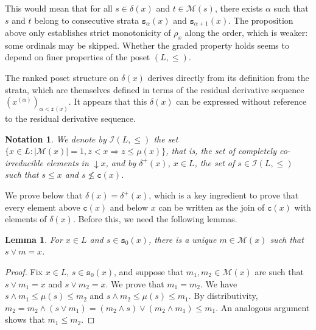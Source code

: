 \documentclass{article}
\newcommand{\comm}[2]{\begin{tcolorbox}[colback=gray!40]\textbf{Comment} (#1) : #2\end{tcolorbox}}
\newtheorem{lemma}[theorem]{Lemma}
\newtheorem{notation}[theorem]{Notation}
\begin{document}
{This would mean that for all \(s \in \delta(x)\) and \(t \in \mathcal{M}(s)\), there exists $\alpha$ such that $s$ and $t$ belong to consecutive strata \(\texttt{s}_{\alpha}(x)\) and \(\texttt{s}_{\alpha+1}(x)\). The proposition above only establishes strict monotonicity of \(\rho_x\) along the order, which is weaker: some ordinals may be skipped. Whether the graded property holds seems to depend on finer properties of the poset \((L,\le)\).}

{The ranked poset structure on \(\delta(x)\) derives directly from its definition from the strata, which are themselves defined in terms of the residual derivative sequence 
\((x^{(\alpha)})_{\alpha<\texttt{r}(x)}\). It appears that this $\delta(x)$
can be expressed without reference 
to the residual derivative sequence.}

\begin{notation}
We denote by $\mathcal{I}(L,\le)$ the set $\{x \in L : |\mathcal{M}(x)|=1, z < x \Rightarrow z \le \mu(x)\}$, {that is, the set of completely co-irreducible elements in $\mathop{\downarrow}x$}, and by ${\delta}^+(x)$, \(x\in L\), the set of $s\in \mathcal{I}(L,\le)$ such that $s \le x$ and $s \not \le \texttt{c}(x)$.
\end{notation}

{We prove below that $\delta(x) = \delta^+(x)$, which is a key ingredient to prove that every element above $\texttt{c}(x)$ and below $x$ can be written as the join of $\texttt{c}(x)$ with elements of $\delta(x)$. Before this, we need the following lemmas.}


\begin{lemma}\label{lemma.complement.uniqueness}
    For $x \in L$ and $s \in \texttt{s}_0(x)$, there is a unique $m \in \mathcal{M}(x)$ such that $s \vee m = x$.
\end{lemma}

\begin{proof}
Fix $x \in L$, $s \in \texttt{s}_0(x)$, and suppose that $m_1, m_2 \in \mathcal{M}(x)$ are such that $s \vee m_1 = x$ and $s \vee m_2 = x$. We prove that $m_1 = m_2$. We have $s \wedge m_1 \le \mu(s) \le m_2$ and $s \wedge m_2 \le \mu(s) \le m_1$. By distributivity, $m_2 = m_2 \wedge (s \vee m_1) = (m_2 \wedge s) \vee (m_2 \wedge m_1) \le m_1$. An analogous argument shows that $m_1 \le m_2$.
\end{proof}
\end{document}
